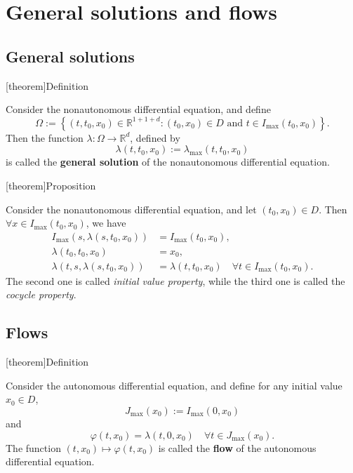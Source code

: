 \documentclass[12pt]{report}
\theoremstyle{definition}
\begin{document}
\section{General solutions and flows}

\subsection{General solutions}

[theorem]{Definition}
\begin{general solution to nonautonomous DE}
    Consider the nonautonomous differential equation, and define
    \[
        \Omega := \left\{(t,t_0,x_0)\in\mathbb{R}^{1+1+d}:
        (t_0,x_0)\in D \text{ and } t\in I_{\text{max}}(t_0,x_0)\right\}.
    \]
    Then the function $\lambda:\Omega\rightarrow\mathbb{R}^{d}$, defined by
    \[
        \lambda(t,t_0,x_0):=\lambda_{\text{max}}(t,t_0,x_0)
    \]
    is called the \textbf{general solution} of the nonautonomous differential
    equation.
\end{general solution to nonautonomous DE}

[theorem]{Proposition}
\begin{properties of the general solution}
    Consider the nonautonomous differential equation,
    and let $(t_0,x_0)\in D$. Then $\forall x\in I_{\text{max}}(t_0,x_0)$, we have
    \begin{align*}
        I_{\text{max}}(s,\lambda(s,t_0,x_0))&=I_{\text{max}}(t_0,x_0), \\
        \lambda(t_0,t_0,x_0) & =x_0, \\
        \lambda(t,s,\lambda(s,t_0,x_0)) &=\lambda(t,t_0,x_0)
        \quad\forall t \in I_{\text{max}}(t_0,x_0).
    \end{align*} 
    The second one is called \emph{initial value property},
    while the third one is called the \emph{cocycle property}.
\end{properties of the general solution}

\subsection{Flows}

[theorem]{Definition}
\begin{flow of an autonomous DE}
    Consider the autonomous differential equation, and define for any initial
    value $x_0\in D$,
    \[
        J_{\text{max}}(x_0):=I_{\text{max}}(0,x_0)
    \]
    and
    \[
        \varphi(t,x_0)=\lambda(t,0,x_0)
        \quad\forall t\in J_{\text{max}}(x_0).
    \]
    The function $(t,x_0)\mapsto \varphi(t,x_0)$ is called the \textbf{flow}
    of the autonomous differential equation.
\end{flow of an autonomous DE}
\end{document}
